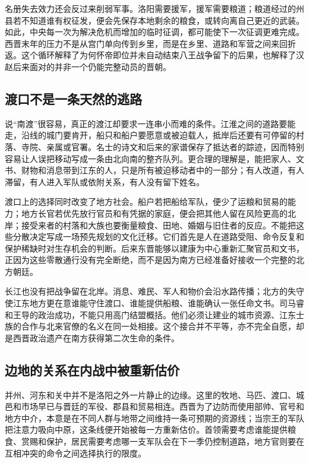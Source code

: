 名册失去效力还会反过来削弱军事。洛阳需要援军，援军需要粮道；粮道经过的州县若不知道谁有权征发，便会先保存本地剩余的粮食，或转向离自己更近的武装。如此，中央每一次为解决危机而增加的临时征调，都可能使下一次征调更难完成。西晋末年的压力不是从宫门单向传到乡里，而是在乡里、道路和军营之间来回折返。这个循环解释了为何怀帝即位并未自动结束八王战争留下的后果，也解释了汉赵后来面对的并非一个仍能完整动员的晋朝。

\subsection{渡口不是一条天然的逃路}

说“南渡”很容易，真正的渡江却要求一连串小而难的条件。江淮之间的道路要能走，沿线的城门要肯开，船只和船户要愿意或被迫载人，抵岸后还要有可停留的村落、寺院、亲属或官署。名士的诗文和后来的家谱保存了抵达者的踪迹，因而特别容易让人误把移动写成一条由北向南的整齐队列。更合理的理解是，能把家人、文书、财物和消息带到江东的人，只是所有被迫移动者中的一部分；有人改道，有人滞留，有人进入军队或依附关系，有人没有留下姓名。

渡口上的选择同时改变了地方社会。船户若把船给军队，便少了运粮和贸易的能力；地方长官若优先放行官员和有凭据的家庭，便会把其他人留在风险更高的北岸；接受来者的村落和大族也要衡量粮食、田地、婚姻与旧住者的反应。不能把这些分散决定写成一场预先规划的文化迁移。它们首先是人在道路受阻、命令反复和保护稀缺时对生存机会的判断。后来东晋能够以建康为中心重新汇聚官员和文书，正因为这些零散通行没有完全断绝，而不是因为南方已经准备好接收一个完整的北方朝廷。

长江也没有把战争留在北岸。消息、难民、军人和物价会沿水路传播；北方的失守使江东地方更在意谁能守住渡口、谁能提供船粮、谁能确认一张任命文书。司马睿和王导的政治成功，不能只用高门结盟概括。他们必须让建业的城市资源、江东士族的合作与北来官僚的名义在同一处相接。这个接合并不平等，亦不完全自愿，却是西晋政治遗产在南方获得第二次生命的条件。

\subsection{边地的关系在内战中被重新估价}

并州、河东和关中并不是洛阳之外一片静止的边缘。这里的牧地、马匹、渡口、城邑和市场早已与晋廷的军役、郡县和贸易相连。西晋为了边防而使用部帅、官号和地方中介，本意是在不同人群与地带之间维持一条可预期的资源线；当宗王的军队把注意力吸向中原，这条线便开始被每一方重新估价。首领需要考虑谁能提供粮食、赏赐和保护，居民需要考虑哪一支军队会在下一季仍控制道路，地方官则要在互相冲突的命令之间选择执行的限度。

